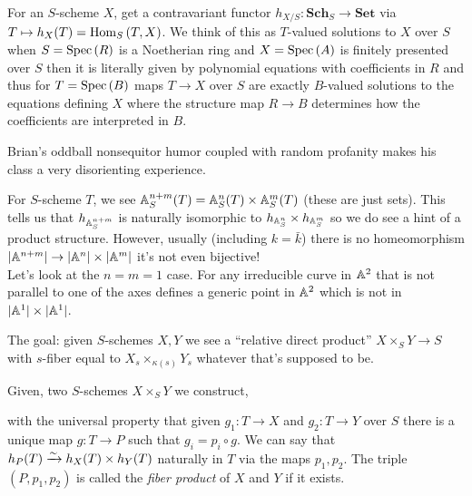\documentclass[12pt]{article}
\begin{document}
For an $S$-scheme $X$, get a contravariant functor $h_{X/S} : \mathbf{Sch}_S \to \mathbf{Set}$ via $T \mapsto h_X(T) = \mathrm{Hom}_{S} \left( T, X \right)$. We think of this as $T$-valued solutions to $X$ over $S$ when $S = \mathrm{Spec}\left( R \right)$ is a Noetherian ring and $X = \mathrm{Spec}\left( A \right)$ is finitely presented over $S$ then it is literally given by polynomial equations with coefficients in $R$ and thus for $T = \mathrm{Spec}\left( B \right)$ maps $T \to X$ over $S$ are exactly $B$-valued solutions to the equations defining $X$ where the structure map $R \to B$ determines how the coefficients are interpreted in $B$.


Brian's oddball nonsequitor humor coupled with random profanity makes his class a very disorienting experience. 

\begin{example}
For $S$-scheme $T$, we see $\mathbb{A}^{n+m}_S(T) = \mathbb{A}^n_S(T) \times \mathbb{A}^m_S(T)$ (these are just sets). This tells us that $h_{\mathbb{A}^{n+m}_S}$ is naturally isomorphic to $h_{\mathbb{A}^n_S} \times h_{\mathbb{A}^m_S}$ so we do see a hint of a product structure. However, usually (including $k = \bar{k}$) there is no homeomorphism $|\mathbb{A}^{n+m}| \to |\mathbb{A}^n| \times |\mathbb{A}^m|$ it's not even bijective!
\bigskip\\
Let's look at the $n = m = 1$ case. For any irreducible curve in $\mathbb{A}^2$ that is not parallel to one of the axes defines a generic point in $\mathbb{A}^2$ which is not in $|\mathbb{A}^1| \times |\mathbb{A}^1|$.
\end{example}

The goal: given $S$-schemes $X,Y$ we see a ``relative direct product'' $X \times_S Y \to S$ with $s$-fiber equal to $X_s \times_{\kappa(s)} Y_s$ whatever that's supposed to be. 

\begin{defn}
Given, two $S$-schemes $X \times_S Y$ we construct,
\begin{center}
\end{center}
with the universal property that given $g_1 : T \to X$ and $g_2 : T \to Y$ over $S$ there is a unique map $g : T \to P$ such that $g_i = p_i \circ g$. We can say that $h_P(T) \xrightarrow{\sim} h_X(T) \times h_Y(T)$ naturally in $T$ via the maps $p_1, p_2$. The triple $(P, p_1, p_2)$ is called the \textit{fiber product} of $X$ and $Y$ if it exists.
\end{defn}
\end{document}
